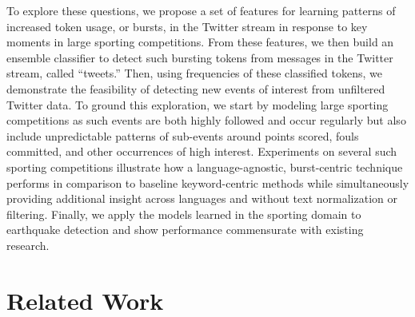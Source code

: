 \documentclass{acm_proc_article-sp}
\begin{document}
To explore these questions, we propose a set of features for learning patterns of increased token usage, or bursts, in the Twitter stream in response to key moments in large sporting competitions.
From these features, we then build an ensemble classifier to detect such bursting tokens from messages in the Twitter stream, called ``tweets.''
Then, using frequencies of these classified tokens, we demonstrate the feasibility of detecting new events of interest from unfiltered Twitter data.
To ground this exploration, we start by modeling large sporting competitions as such events are both highly followed and occur regularly but also include unpredictable patterns of sub-events around points scored, fouls committed, and other occurrences of high interest.
Experiments on several such sporting competitions illustrate how a language-agnostic, burst-centric technique performs in comparison to baseline keyword-centric methods while simultaneously providing additional insight across languages and without text normalization or filtering.
Finally, we apply the models learned in the sporting domain to earthquake detection and show performance commensurate with existing research.


\section{Related Work}
\label{sect:relatedWork}
\end{document}
